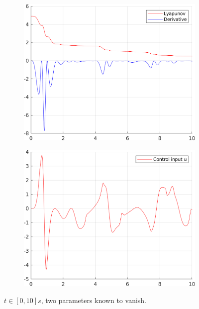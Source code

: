 \documentclass[12pt,a4paper]{article}
\begin{document}
\begin{figure}[H]
\begin{subfigure}{.45\textwidth}
		\end{subfigure}
		\begin{subfigure}{.45\textwidth}
			\centering
			\includegraphics[width=1\textwidth]{Graphics/NonLinearLyapunovZero1.png}
		\end{subfigure}%
		\begin{subfigure}{.45\textwidth}
			\centering
			\includegraphics[width=1\textwidth]{Graphics/NonLinearControlZero1.png}
		\end{subfigure}
		\caption{$t \in [0,10]s$, two parameters known to vanish.}
	\end{figure}
\end{document}
